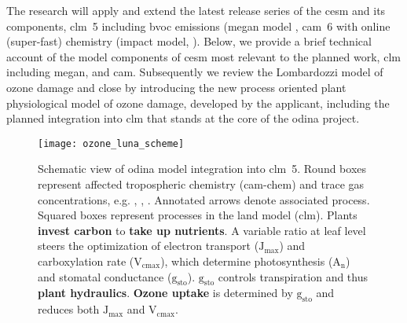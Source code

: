 The research will apply and extend the latest release series of the \gls{cesm} and its components, \gls{clm}~5 including \gls{bvoc} emissions (\gls{megan} model \parencite{ACP:Guenther2006}, \gls{cam}~6 with online (super-fast) chemistry (\gls{impact} model, \textcite{JGR:Rotman2004}). Below, we provide  a brief technical account of the model components of \gls{cesm} most relevant to the planned work, \gls{clm} including \gls{megan}, and \gls{cam}. Subsequently we review  the Lombardozzi model of ozone damage and close by introducing the new process oriented plant physiological model of ozone damage, developed by the applicant, including the planned integration into \gls{clm} that stands at the core of the \gls{odina} project.

\begin{wrapfigure}[33]{R}[0pt]{0.5\textwidth}
  \centering
  \texttt{[image: ozone\_luna\_scheme]}
  \caption{Schematic view of \gls{odina} model integration into \gls{clm}~5. Round boxes represent affected tropospheric chemistry (\gls{cam}-chem) and trace gas concentrations, e.g. \ch{[CO_2]}, \ch{[O_3]}, \ch{[H_2O]}. Annotated arrows denote associated process. Squared boxes represent processes in the land model (\gls{clm}). Plants \textbf{\color{darkgray}invest carbon} to \textbf{\color{darkgray}take up nutrients}. A variable  ratio at leaf level steers the optimization of electron transport ($\mathrm{J_{max}}$) and carboxylation rate ($\mathrm{V_{cmax}}$), which determine photosynthesis ($\mathrm{A_n}$) and stomatal conductance ($\mathrm{g_{sto}}$). $\mathrm{g_{sto}}$ controls transpiration and thus \textbf{\color{blue}plant hydraulics}. \textbf{\color{red}Ozone uptake} is determined by $\mathrm{g_{sto}}$ and reduces both $\mathrm{J_{max}}$ and $\mathrm{V_{cmax}}$.
}
  \label{fig:ozone_odina}
\end{wrapfigure}

